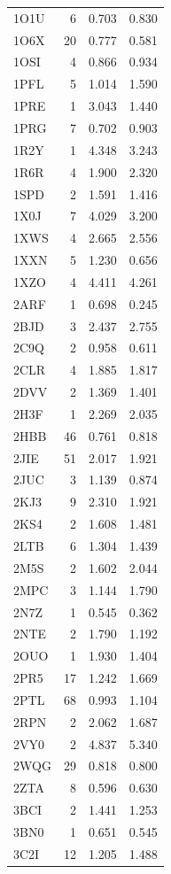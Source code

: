 \begin{longtable}{lrrr}
1O1U & 6 & 0.703 & 0.830\\
1O6X & 20 & 0.777 & 0.581\\
1OSI & 4 & 0.866 & 0.934\\
1PFL & 5 & 1.014 & 1.590\\
1PRE & 1 & 3.043 & 1.440\\
1PRG & 7 & 0.702 & 0.903\\
1R2Y & 1 & 4.348 & 3.243\\
1R6R & 4 & 1.900 & 2.320\\
1SPD & 2 & 1.591 & 1.416\\
1X0J & 7 & 4.029 & 3.200\\
1XWS & 4 & 2.665 & 2.556\\
1XXN & 5 & 1.230 & 0.656\\
1XZO & 4 & 4.411 & 4.261\\
2ARF & 1 & 0.698 & 0.245\\
2BJD & 3 & 2.437 & 2.755\\
2C9Q & 2 & 0.958 & 0.611\\
2CLR & 4 & 1.885 & 1.817\\
2DVV & 2 & 1.369 & 1.401\\
2H3F & 1 & 2.269 & 2.035\\
2HBB & 46 & 0.761 & 0.818\\
2JIE & 51 & 2.017 & 1.921\\
2JUC & 3 & 1.139 & 0.874\\
2KJ3 & 9 & 2.310 & 1.921\\
2KS4 & 2 & 1.608 & 1.481\\
2LTB & 6 & 1.304 & 1.439\\
2M5S & 2 & 1.602 & 2.044\\
2MPC & 3 & 1.144 & 1.790\\
2N7Z & 1 & 0.545 & 0.362\\
2NTE & 2 & 1.790 & 1.192\\
2OUO & 1 & 1.930 & 1.404\\
2PR5 & 17 & 1.242 & 1.669\\
2PTL & 68 & 0.993 & 1.104\\
2RPN & 2 & 2.062 & 1.687\\
2VY0 & 2 & 4.837 & 5.340\\
2WQG & 29 & 0.818 & 0.800\\
2ZTA & 8 & 0.596 & 0.630\\
3BCI & 2 & 1.441 & 1.253\\
3BN0 & 1 & 0.651 & 0.545\\
3C2I & 12 & 1.205 & 1.488\\

\end{longtable}
